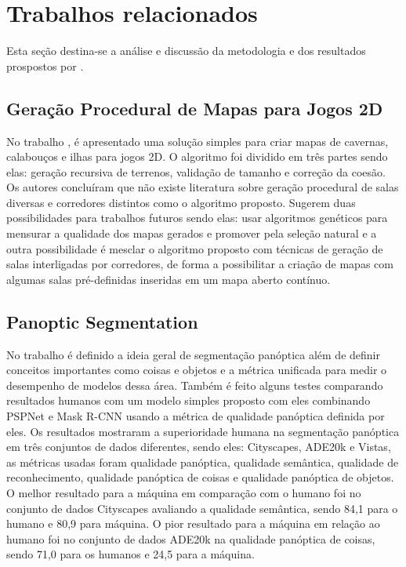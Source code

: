 \section{Trabalhos relacionados}

Esta seção destina-se a análise e discussão da metodologia e dos resultados prospostos por . 

\subsection*{Geração Procedural de Mapas para Jogos 2D}

No trabalho , é apresentado uma solução simples para criar mapas de cavernas, calabouços e ilhas para jogos 2D. O algoritmo foi dividido em três partes sendo elas: geração recursiva de terrenos, validação de tamanho e correção da coesão. Os autores concluíram que não existe literatura sobre geração procedural de salas diversas e corredores distintos como o algoritmo proposto. Sugerem duas possibilidades para trabalhos futuros sendo elas: usar algoritmos genéticos para mensurar a qualidade dos mapas gerados e promover pela seleção natural e a outra possibilidade é mesclar o algoritmo proposto com técnicas de geração de salas interligadas por corredores, de forma a possibilitar a criação de mapas com algumas salas pré-definidas inseridas em um mapa aberto contínuo.

\subsection*{Panoptic Segmentation}

No trabalho  é definido a ideia geral de segmentação panóptica além de definir conceitos importantes como coisas e objetos e a métrica unificada para medir o desempenho de modelos dessa área. Também é feito alguns testes comparando resultados humanos com um modelo simples proposto com eles combinando PSPNet e Mask R-CNN usando a métrica de qualidade panóptica definida por eles. Os resultados mostraram a superioridade humana na segmentação panóptica em três conjuntos de dados diferentes, sendo eles: Cityscapes, ADE20k e Vistas, as métricas usadas foram qualidade panóptica, qualidade semântica, qualidade de reconhecimento, qualidade panóptica
 de coisas e qualidade panóptica de objetos. O melhor resultado para a máquina em comparação com o humano foi no conjunto de dados Cityscapes avaliando a qualidade semântica, sendo 84,1 para o humano e 80,9 para máquina. O pior resultado para a máquina em relação ao humano foi no conjunto de dados ADE20k na qualidade panóptica de coisas, sendo 71,0 para os humanos e 24,5 para a máquina.


